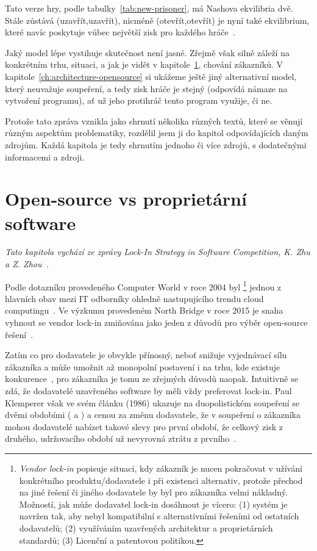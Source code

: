 \begin{multicols}{2}
Tato verze hry, podle tabulky~\ref{tab:new-prisoner}, má Nashova ekvilibria dvě. Stále zůstává (uzavřít,uzavřít), nicméně (otevřít,otevřít) je nyní také ekvilibrium, které navíc poskytuje vůbec největší zisk pro každého hráče~\cite{network-effects-opensource}.

Jaký model lépe vystihuje skutečnost není jasné. Zřejmě však silně záleží na konkrétním trhu, situaci, a jak je vidět v kapitole~\ref{ch:opensource-vs-proprietary}, chování zákazníků. V kapitole~\ref{ch:architecture-opensource} si ukážeme ještě jiný alternativní model, který neuvažuje soupeření, a tedy zisk hráče je stejný (odpovídá námaze na vytvoření programu), ať už jeho protihráč tento program využije, či ne.

Protože tato zpráva vznikla jako shrnutí několika různých textů, které se věnují různým aspektům problematiky, rozdělil jsem ji do kapitol odpovídajících daným zdrojům. Každá kapitola je tedy shrnutím jednoho či více zdrojů, s dodatečnými informacemi a zdroji.




\section{Open-source vs proprietární software}
\label{ch:opensource-vs-proprietary}
	{\em Tato kapitola vychází ze zprávy Lock-In Strategy in Software Competition, K. Zhu a Z. Zhou~\cite{lock-in-competition}.}

	Podle dotazníku provedeného Computer World v roce 2004 byl \footnote{{\em Vendor lock-in} popisuje situaci, kdy zákazník je nucen pokračovat v užívání konkrétního produktu/dodavatele i při existenci alternativ, protože přechod na jiné řešení či jiného dodavatele by byl pro zákazníka velmi nákladný. Možností, jak může dodavatel lock-in dosáhnout je vícero: (1) systém je navržen tak, aby nebyl kompatibilní s alternativními řešeními od ostatních dodavatelů; (2) využíváním uzavřených architektur a proprietárních standardů; (3) Licenční a patentovou politikou.} jednou z hlavních obav mezi IT odborníky ohledně nastupujícího trendu cloud computingu~\cite{computer-world-2004}. Ve výzkumu provedeném North Bridge v roce 2015 je snaha vyhnout se vendor lock-in zmiňována jako jeden z důvodů pro výběr open-source řešení~\cite{survey-2015}.

	Zatím co pro dodavatele je  obvykle přínosný, neboť snižuje
	vyjednávací sílu zákazníka a může umožnit až monopolní postavení i na trhu,
	kde existuje konkurence~\cite[str. 1]{lock-in-competition}, pro zákazníka
	je tomu ze zřejmých důvodů naopak. Intuitivně se zdá, že dodavatelé
	uzavřeného software by měli vždy preferovat lock-in. Paul Klemperer však ve
	svém článku (1986) ukazuje na duopolistickém soupeření se dvěmi obdobími
	( a ) a cenou za změnu dodavatele, že v soupeření o zákazníka mohou dodavatelé nabízet takové slevy pro první období, že celkový zisk z druhého, udržovacího období už nevyrovná ztrátu z prvního~\cite{klemperer-switching-costs,lock-in-competition}.


\end{multicols}
